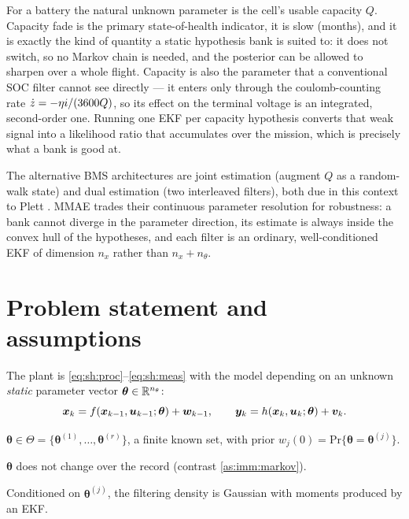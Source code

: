 For a battery the natural unknown parameter is the cell's usable capacity $Q$.  Capacity fade is the
primary state-of-health indicator, it is slow (months), and it is exactly the kind of quantity a
static hypothesis bank is suited to: it does not switch, so no Markov chain is needed, and the
posterior can be allowed to sharpen over a whole flight.  Capacity is also the parameter that a
conventional SOC filter cannot see directly --- it enters only through the coulomb-counting rate
$\dot{z} = -\eta i/(3600Q)$, so its effect on the terminal voltage is an integrated, second-order
one.  Running one EKF per capacity hypothesis converts that weak signal into a likelihood ratio that
accumulates over the mission, which is precisely what a bank is good at.

The alternative BMS architectures are joint estimation (augment $Q$ as a random-walk state) and dual
estimation (two interleaved filters), both due in this context to Plett \cite{plett2004ekf3}.  MMAE
trades their continuous parameter resolution for robustness: a bank cannot diverge in the parameter
direction, its estimate is always inside the convex hull of the hypotheses, and each filter is an
ordinary, well-conditioned EKF of dimension $n_x$ rather than $n_x+n_\theta$.

\section{Problem statement and assumptions}
The plant is \eqref{eq:sh:proc}--\eqref{eq:sh:meas} with the model depending on an unknown
\emph{static} parameter vector $\bm\theta\in\mathbb{R}^{n_\theta}$:
\begin{equation}
\bm{x}_k = f(\bm{x}_{k-1},\bm{u}_{k-1};\bm\theta)+\bm{w}_{k-1},\qquad
\bm{y}_k = h(\bm{x}_k,\bm{u}_k;\bm\theta)+\bm{v}_k .
\label{eq:mm:plant}
\end{equation}
\begin{assumption}\label{as:mm:grid}
$\bm\theta\in\Theta = \{\bm\theta^{(1)},\dots,\bm\theta^{(r)}\}$, a finite known set, with prior
$w_j(0)=\mathrm{Pr}\{\bm\theta=\bm\theta^{(j)}\}$.
\end{assumption}
\begin{assumption}\label{as:mm:static}
$\bm\theta$ does not change over the record (contrast \cref{as:imm:markov}).
\end{assumption}
\begin{assumption}\label{as:mm:gauss}
Conditioned on $\bm\theta^{(j)}$, the filtering density is Gaussian with moments produced by an EKF.
\end{assumption}

